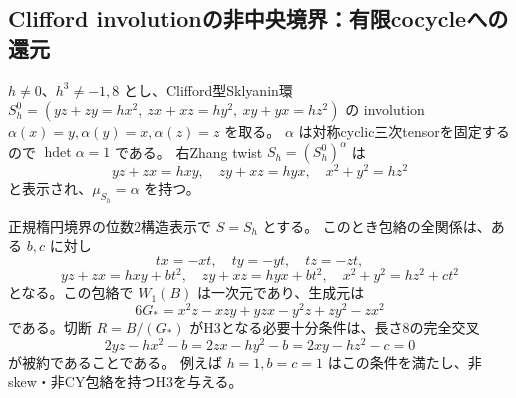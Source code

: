 \subsection{Clifford involutionの非中央境界：有限cocycleへの還元}
\label{subsec:normal-order2-clifford}
$h\ne0$、$h^3\ne-1,8$ とし、Clifford型Sklyanin環
$S_h^0=(yz+zy=hx^2,\ zx+xz=hy^2,\ xy+yx=hz^2)$ の
involution $\alpha(x)=y,\alpha(y)=x,\alpha(z)=z$ を取る。
$\alpha$ は対称cyclic三次tensorを固定するので $\operatorname{hdet}\alpha=1$ である。
右Zhang twist $S_h=(S_h^0)^\alpha$ は
\[
 yz+zx=hxy,\quad zy+xz=hyx,\quad x^2+y^2=hz^2
\]
と表示され、$\mu_{S_h}=\alpha$ を持つ。

\begin{theorem}
\label{thm:normal-order2-clifford-cuts}
正規楕円境界の位数2構造表示で $S=S_h$ とする。
このとき包絡の全関係は、ある $b,c$ に対し
\[
 tx=-xt,\quad ty=-yt,\quad tz=-zt,
\]
\[
 yz+zx=hxy+bt^2,\quad zy+xz=hyx+bt^2,\quad
 x^2+y^2=hz^2+ct^2
\]
となる。この包絡で $W_1(B)$ は一次元であり、生成元は
\[
 6G_*=x^2z-xzy+yzx-y^2z+zy^2-zx^2
\]
である。切断 $R=B/(G_*)$ がH3となる必要十分条件は、長さ8の完全交叉
\[
 2yz-hx^2-b=2zx-hy^2-b=2xy-hz^2-c=0
\]
が被約であることである。
例えば $h=1,b=c=1$ はこの条件を満たし、非skew・非CY包絡を持つH3を与える。
\end{theorem}
